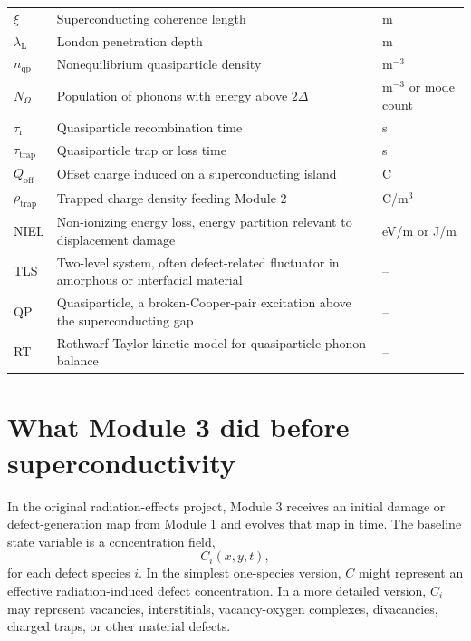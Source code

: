 \documentclass[11pt]{article}
\begin{document}
\begin{longtable}{p{} p{} p{}}
$\xi$ & Superconducting coherence length & m \\
$\lambda_{\mathrm{L}}$ & London penetration depth & m \\
$n_{\mathrm{qp}}$ & Nonequilibrium quasiparticle density & m$^{-3}$ \\
$N_{\Omega}$ & Population of phonons with energy above $2\Delta$ & m$^{-3}$ or mode count \\
$\tau_{\mathrm{r}}$ & Quasiparticle recombination time & s \\
$\tau_{\mathrm{trap}}$ & Quasiparticle trap or loss time & s \\
$Q_{\mathrm{off}}$ & Offset charge induced on a superconducting island & C \\
$\rho_{\mathrm{trap}}$ & Trapped charge density feeding Module 2 & C/m$^3$ \\
NIEL & Non-ionizing energy loss, energy partition relevant to displacement damage & eV/m or J/m \\
TLS & Two-level system, often defect-related fluctuator in amorphous or interfacial material & -- \\
QP & Quasiparticle, a broken-Cooper-pair excitation above the superconducting gap & -- \\
RT & Rothwarf-Taylor kinetic model for quasiparticle-phonon balance & -- \\
\bottomrule
\end{longtable}

\section{What Module 3 did before superconductivity}

In the original radiation-effects project, Module 3 receives an initial damage or defect-generation map from Module 1 and evolves that map in time. The baseline state variable is a concentration field,
\begin{equation}
C_i(x,y,t),
\end{equation}
for each defect species $i$. In the simplest one-species version, $C$ might represent an effective radiation-induced defect concentration. In a more detailed version, $C_i$ may represent vacancies, interstitials, vacancy-oxygen complexes, divacancies, charged traps, or other material defects.
\end{document}
